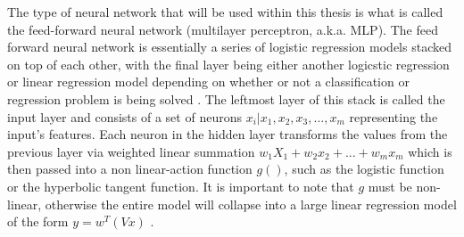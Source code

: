 The type of neural network that will be used within this thesis is
what is called the feed-forward neural network (multilayer perceptron,
a.k.a. MLP). The feed forward neural network is essentially a series of
logistic regression models stacked on top of each other, with the
final layer being either another logicstic regression or linear
regression model depending on whether or not a classification or
regression problem is being solved \cite{Murphy}. The leftmost
layer of this stack is called the input layer and consists of a set of
neurons ${x_i|x_1,x_2,x_3,...,x_m}$ representing the input's
features. Each neuron in the hidden layer transforms the values from
the previous layer via weighted linear summation $w_1X_1 + w_2x_2 +...+w_mx_m$
which is then passed into a non linear-action function $g()$, such as the
logistic function or the hyperbolic tangent function. It is important to note
that $g$ must be non-linear, otherwise the entire model will collapse into a
large linear regression model of the form $y = w^T(Vx)$ \cite{Murphy}.

